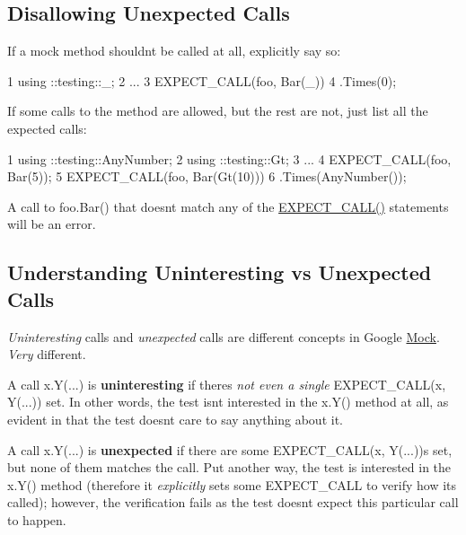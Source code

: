 \subsection*{Disallowing Unexpected Calls}

If a mock method shouldn\textquotesingle{}t be called at all, explicitly say so\+:


\begin{DoxyCode}
1 using ::testing::\_;
2 ...
3   EXPECT\_CALL(foo, Bar(\_))
4       .Times(0);
\end{DoxyCode}


If some calls to the method are allowed, but the rest are not, just list all the expected calls\+:


\begin{DoxyCode}
1 using ::testing::AnyNumber;
2 using ::testing::Gt;
3 ...
4   EXPECT\_CALL(foo, Bar(5));
5   EXPECT\_CALL(foo, Bar(Gt(10)))
6       .Times(AnyNumber());
\end{DoxyCode}


A call to {\ttfamily foo.\+Bar()} that doesn\textquotesingle{}t match any of the {\ttfamily \hyperlink{gmock-spec-builders_8h_a535a6156de72c1a2e25a127e38ee5232}{E\+X\+P\+E\+C\+T\+\_\+\+C\+A\+L\+L()}} statements will be an error.

\subsection*{Understanding Uninteresting vs Unexpected Calls}

{\itshape Uninteresting} calls and {\itshape unexpected} calls are different concepts in Google \hyperlink{class_mock}{Mock}. {\itshape Very} different.

A call {\ttfamily x.\+Y(...)} is {\bfseries uninteresting} if there\textquotesingle{}s {\itshape not even a single} {\ttfamily E\+X\+P\+E\+C\+T\+\_\+\+C\+A\+LL(x, Y(...))} set. In other words, the test isn\textquotesingle{}t interested in the {\ttfamily x.\+Y()} method at all, as evident in that the test doesn\textquotesingle{}t care to say anything about it.

A call {\ttfamily x.\+Y(...)} is {\bfseries unexpected} if there are some {\ttfamily E\+X\+P\+E\+C\+T\+\_\+\+C\+A\+LL(x, Y(...))s} set, but none of them matches the call. Put another way, the test is interested in the {\ttfamily x.\+Y()} method (therefore it {\itshape explicitly} sets some {\ttfamily E\+X\+P\+E\+C\+T\+\_\+\+C\+A\+LL} to verify how it\textquotesingle{}s called); however, the verification fails as the test doesn\textquotesingle{}t expect this particular call to happen.


